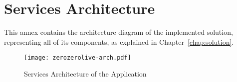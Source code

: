 \chapter{Services Architecture} \label{ap1:annex-high-level-arch}

This annex contains the architecture diagram of the implemented solution, representing all of its components, as explained in Chapter~\ref{chap:solution}.

\begin{landscape}
    \begin{figure}
       \centering
        \texttt{[image: zerozerolive-arch.pdf]}
        \caption{Services Architecture of the Application}
        \label{fig:annex-high-level-arch}
    \end{figure}
    \end{landscape}


    

